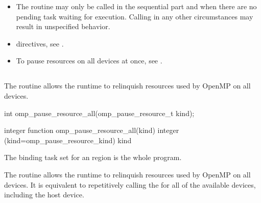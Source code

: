 \begin{itemize}
\item The routine may only be called in the sequential part and when there are no pending 
task waiting for execution. Calling in any other circumstances may result in unspecified behavior.
\end{itemize}

\crossreferences

\begin{itemize}
\item {} directives, see
.

\item To pause resources on all devices at once, see
.
\end{itemize}




\subsection{}
\label{subsec:omp_pause_resource_all}
\summary

The  routine allows the runtime to 
relinquish resources used by OpenMP on all devices.

\begin{samepage}
\format
\begin{ccppspecific}
\begin{ompcFunction}
int omp_pause_resource_all(omp_pause_resource_t kind);
\end{ompcFunction}
\end{ccppspecific}
\end{samepage}

\begin{fortranspecific}
\begin{ompfFunction}
integer function omp_pause_resource_all(kind)
integer (kind=omp_pause_resource_kind) kind
\end{ompfFunction}
\end{fortranspecific}

\binding

The binding task set for an  region is the whole program.

\effect

The  routine allows the runtime to relinquish resources 
used by OpenMP on all devices. It is equivalent to repetitively 
calling the  for all of the available devices, including the host device.

